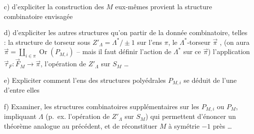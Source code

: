 c) d'expliciter la construction des $M$
eux-mêmes  provient la structure
combinatoire envisagée

d) d'expliciter les autres structures qu'on
  partir de la donnée combinatoire, telles : la structure de \deleted{$\Lambda^*$}
torseur sous $Z'_\Lambda=\Lambda^*/\pm1$ sur l'ens $\pi$,
le $\Lambda^*$-torseur $\overrightarrow\pi$ ,
 (on
aura $\overrightarrow\pi=\coprod_{i\in\pi}\operatorname{Or}(P_{M,i})$ -- mais il faut
définir l'action de $\Lambda^*$ sur ce $\overrightarrow\pi$)
l'application $\overrightarrow\tau_F:\overrightarrow F_M\to\overrightarrow\pi$, l'opération
de $Z'_\Lambda$ sur $S_M$ \ldots

e) Expliciter comment l'ens des structures
polyédrales $P_{M,i}$ se déduit de l'une
d'entre elles

f) Examiner,  les structures combinatoires
supplémentaires sur les $P_{M,i}$ ou $P_M$,
impliquant $\Lambda$ (p.~ex. l'opération de
$Z'_\Lambda$ sur $S_M$) qui permettent d'énoncer un théorème analogue
au précédent, et de réconstituer
$M$ à symétrie $-1$ près \ldots
